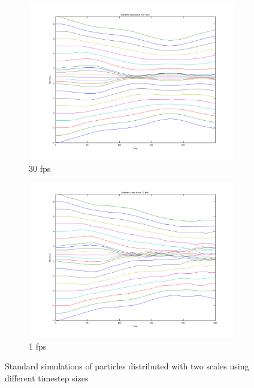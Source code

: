 \documentclass[11pt]{article}
\begin{document}
\begin{figure}[H]
    \begin{subfigure}{0.5\textwidth}
        \includegraphics[width=\textwidth]{../images/standard_multiscale_30fps.png}
        \caption{30 fps}
        \label{fig:std_multi_30fps}
    \end{subfigure}
    \begin{subfigure}{0.5\textwidth}
        \includegraphics[width=\textwidth]{../images/standard_multiscale_1fps.png}
        \caption{1 fps}
        \label{fig:std_multi_1fps}
    \end{subfigure}
    \caption{Standard simulations of particles distributed with two scales using
    different timestep sizes}
    \label{fig:std}
\end{figure}
\end{document}
